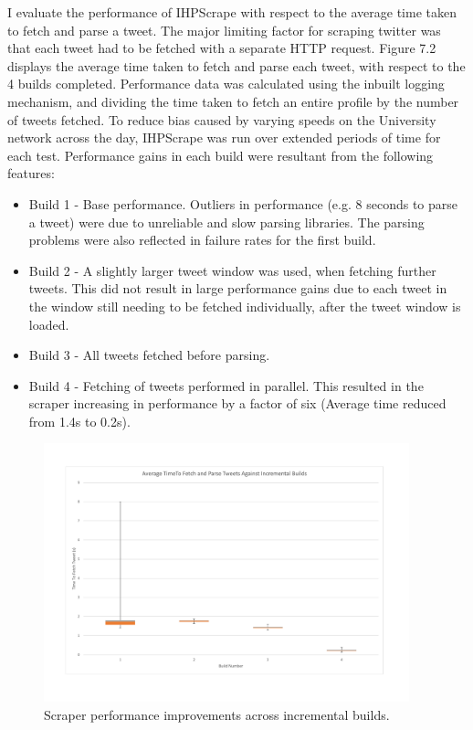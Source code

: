 I evaluate the performance of IHPScrape with respect to the average time taken to fetch and parse a tweet. The major limiting factor for scraping twitter was that each tweet had to be fetched with a separate HTTP request. Figure 7.2 displays the average time taken to fetch and parse each tweet, with respect to the 4 builds completed. Performance data was calculated using the inbuilt logging mechanism, and dividing the time taken to fetch an entire profile by the number of tweets fetched. To reduce bias caused by varying speeds on the University network across the day, IHPScrape was run over extended periods of time for each test. Performance gains in each build were resultant from the following features:

\begin{itemize}
 \item Build 1 - Base performance. Outliers in performance (e.g. 8 seconds to parse a tweet) were due to unreliable and slow parsing libraries. The parsing problems were also reflected in failure rates for the first build.
 \item Build 2 - A slightly larger tweet window was used, when fetching further tweets. This did not result in large performance gains due to each tweet in the window still needing to be fetched individually, after the tweet window is loaded. 
 \item Build 3 - All tweets fetched before parsing. 
 \item Build 4 - Fetching of tweets performed in parallel. This resulted in the scraper increasing in performance by a factor of six (Average time reduced from 1.4s to 0.2s).
\end{itemize}

\begin{figure}[h!]
\centering
\includegraphics[width=400px]{Images/scrape_performance_against_builds.pdf}
\caption{Scraper performance improvements across incremental builds. }
\end{figure}


